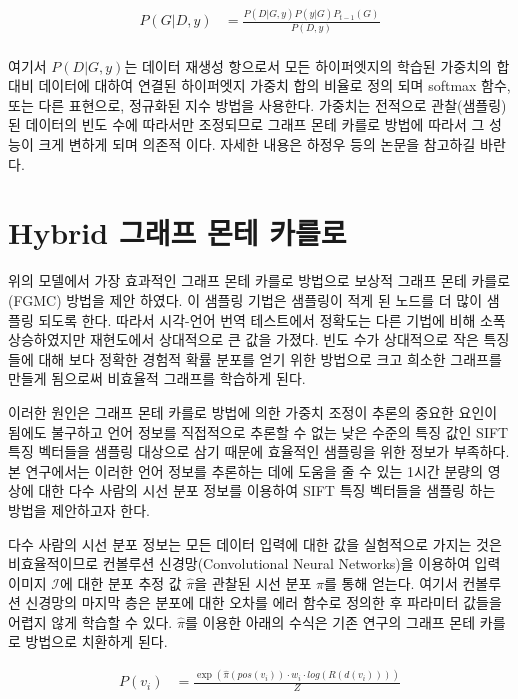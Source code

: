 \documentclass{kcc}
\begin{document}
\begin{equation} \label{eq2}
\begin{split}
P(G|D,y) & = \frac{P(D|G,y) P(y|G) P_{t-1}(G)} {P(D,y)} \\
\end{split}
\end{equation}

여기서 $P(D|G,y)$는 데이터 재생성 항으로서 모든 하이퍼엣지의 학습된 가중치의 합 대비 데이터에 대하여 연결된 하이퍼엣지 가중치 합의 비율로 정의 되며 softmax 함수, 또는 다른 표현으로, 정규화된 지수 방법을 사용한다. 가중치는 전적으로 관찰(샘플링) 된 데이터의 빈도 수에 따라서만 조정되므로 그래프 몬테 카를로 방법에 따라서 그 성능이 크게 변하게 되며 의존적 이다\cite{zhang1994accelerated,Zhang1998}. 자세한 내용은 하정우 등\cite{Ha2015}의 논문을 참고하길 바란다.

\section{Hybrid 그래프 몬테 카를로}
위의 모델에서 가장 효과적인 그래프 몬테 카를로 방법으로 보상적 그래프 몬테 카를로(FGMC) 방법을 제안 하였다. 이 샘플링 기법은 샘플링이 적게 된 노드를 더 많이 샘플링 되도록 한다. 따라서 시각-언어 번역 테스트에서 정확도는 다른 기법에 비해 소폭 상승하였지만 재현도에서 상대적으로 큰 값을 가졌다. 빈도 수가 상대적으로 작은 특징들에 대해 보다 정확한 경험적 확률 분포를 얻기 위한 방법으로 크고 희소한 그래프를 만들게 됨으로써 비효율적 그래프를 학습하게 된다.

이러한 원인은 그래프 몬테 카를로 방법에 의한 가중치 조정이 추론의 중요한 요인이 됨에도 불구하고 언어 정보를 직접적으로 추론할 수 없는 낮은 수준의 특징 값인 SIFT 특징 벡터들을 샘플링 대상으로 삼기 때문에 효율적인 샘플링을 위한 정보가 부족하다. 본 연구에서는 이러한 언어 정보를 추론하는 데에 도움을 줄 수 있는 1시간 분량의 영상에 대한 다수 사람의 시선 분포 정보를 이용하여 SIFT 특징 벡터들을 샘플링 하는 방법을 제안하고자 한다.

다수 사람의 시선 분포 정보는 모든 데이터 입력에 대한 값을 실험적으로 가지는 것은 비효율적이므로 컨볼루션 신경망(Convolutional Neural Networks)을 이용하여 입력 이미지 $\mathcal{I}$에 대한 분포 추정 값 $\hat{\pi}$을 관찰된 시선 분포 $\pi$를 통해 얻는다. 여기서 컨볼루션 신경망의 마지막 층은 분포에 대한 오차를 에러 함수로 정의한 후 파라미터 값들을 어렵지 않게 학습할 수 있다. $\hat{\pi}$를 이용한 아래의 수식은 기존 연구의 그래프 몬테 카를로 방법으로 치환하게 된다.

\begin{equation} \label{eq3}
\begin{split}
P(v_{i}) & = \frac{\exp(\hat{\pi}(pos(v_{i})) \cdot w_{i} \cdot log(R(d(v_{i}))))}{Z}
\end{split}
\end{equation}
\end{document}
